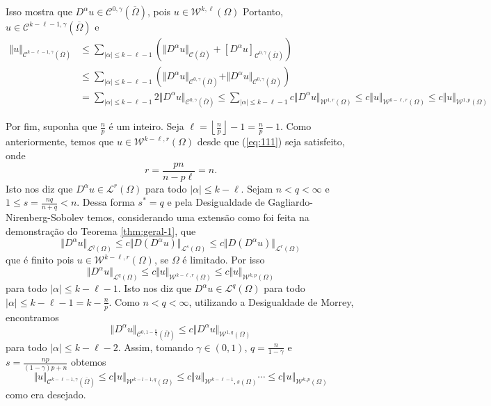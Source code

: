 \documentclass[a4paper, 11pt]{book}
\theoremstyle{definition}
\newcommand{\cC}{\mathcal{C}}
\newcommand{\cL}{\mathcal{L}}
\newcommand{\cW}{\mathcal{W}}
\begin{document}
\begin{prf}
    Isso mostra que $D^\alpha u \in \cC^{0,\gamma}(\overline\Omega)$, pois $u \in \cW^{k,\ell}(\Omega)$
    Portanto, $u \in \cC^{k-\ell-1,\gamma}(\overline\Omega)$ e
    \[
        \begin{aligned}
            \Vert u \Vert_{\cC^{k-\ell-1,\gamma}(\overline\Omega)} &\leqslant \sum_{|\alpha| \leqslant k - \ell - 1} \left( \Vert D^\alpha u \Vert_{\cC(\overline\Omega)} + [D^\alpha u]_{\cC^{0,\gamma}(\overline\Omega)} \right)\\ &\leqslant \sum_{|\alpha| \leqslant k - \ell - 1} \left(    \Vert D^\alpha u \Vert_{\cC^{0,\gamma}(\overline\Omega)} +  \Vert D^\alpha u \Vert_{\cC^{0,\gamma}(\overline\Omega)}\right)\\
            &=\sum_{|\alpha| \leqslant k - \ell - 1}\!\!\!\! 2\Vert D^\alpha u \Vert_{\cC^{0,\gamma}(\overline\Omega)} \leqslant \sum_{|\alpha| \leqslant k - \ell - 1} \!\!\! c\Vert D^\alpha u \Vert_{\cW^{1,r}(\Omega)} \leqslant c \Vert u \Vert_{\cW^{k-\ell,r}(\Omega)} \leqslant c \Vert u \Vert_{\cW^{1,p}(\Omega)}
        \end{aligned}
    \]

    Por fim, suponha que $\frac{n}{p}$ é um inteiro. Seja $\ell = \left\lfloor \frac{n}{p} \right\rfloor - 1 = \frac{n}{p} - 1$.
    Como anteriormente, temos que $u \in \cW^{k-\ell,r}(\Omega)$ desde que (\ref{eq:111}) seja satisfeito, onde
    \[
        r = \frac{pn}{n - p\ell} = n.
    \]
    Isto nos diz que $D^\alpha u \in \cL^r(\Omega)$ para todo $|\alpha| \leqslant k - \ell$.
    Sejam $n < q < \infty$ e $1 \leqslant s = \frac{nq}{n + q} < n$. Dessa forma $s^* = q$ e pela Desigualdade de Gagliardo-Nirenberg-Sobolev temos, considerando uma extensão como foi feita na demonstração do Teorema \ref{thm:geral-1}, que
    \[
        \Vert D^\alpha u \Vert_{\cL^q(\Omega)}\leqslant c\Vert D(D^\alpha u) \Vert_{\cL^s(\Omega)} \leqslant c \Vert D(D^\alpha u) \Vert_{\cL^r(\Omega)}
    \]
    que é finito pois $u \in \cW^{k-\ell,r}(\Omega)$, se $\Omega$ é limitado. Por isso
    \[
        \Vert D^\alpha u \Vert_{\cL^q(\Omega)} \leqslant c \Vert u \Vert_{\cW^{k-\ell,r}(\Omega)} \leqslant c \Vert u \Vert_{\cW^{k,p}(\Omega)}
    \]
    para todo $|\alpha| \leqslant k - \ell - 1$. Isto nos diz que $D^\alpha u \in \cL^q(\Omega)$ para todo $|\alpha| \leqslant k - \ell - 1 = k - \frac{n}{p}$.
    Como $n < q < \infty$, utilizando a Desigualdade de Morrey, encontramos
    \[
        \Vert D^\alpha u \Vert_{\cC^{0,1 - \frac{n}{q}}(\overline\Omega)} \leqslant c \Vert D^\alpha u \Vert_{\cW^{1,q}(\Omega)}
    \]
    para todo $|\alpha| \leqslant k - \ell - 2$.
    Assim, tomando $\gamma \in (0,1)$, $q = \frac{n}{1 - \gamma}$ e $s = \frac{np}{(1- \gamma)p + n}$ obtemos
    \[
        \Vert u \Vert_{\cC^{k-\ell-1,\gamma}(\overline\Omega)} \leqslant c\Vert u \Vert_{\cW^{k-l-1,q}(\Omega)} \leqslant c \Vert u \Vert_{\cW^{k-\ell-1},s(\Omega)} \cdots \leqslant c \Vert u \Vert_{\cW^{k,p}(\Omega)}
    \]
    como era desejado.
\end{prf}
\end{document}
